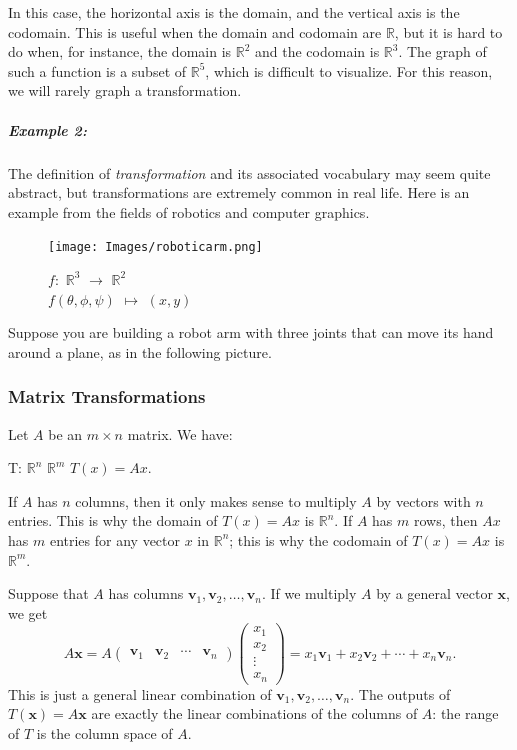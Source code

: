 \documentclass[a4paper,12pt]{article}
\begin{document}
In this case, the horizontal axis is the domain, and the vertical axis is the codomain. This is useful when the domain and codomain are $\mathbb{R}$, but it is hard to do when, for instance, the domain is $\mathbb{R}^2$ and the codomain is $\mathbb{R}^3$.
The graph of such a function is a subset of $\mathbb{R}^5$, which is difficult to visualize. For this reason, we will rarely graph a transformation.

\subparagraph{Example 2:}The definition of \textit{transformation} and its associated vocabulary may seem quite abstract, but transformations are extremely common in real life. Here is an example from the fields of robotics and computer graphics.
\begin{figure}[H]
    \centering
    \texttt{[image: Images/roboticarm.png]}
    \caption{$f:$ \(\mathbb{R}^3\) $\rightarrow$ \(\mathbb{R}^2\)\\
    \quad $f(\theta,\phi,\psi)$ $\longmapsto$ $(x,y)$
    }
    \label{fig:robotic-arm}
\end{figure}


Suppose you are building a robot arm with three joints that can move its hand around a plane, as in the following picture.

\subsubsection{Matrix Transformations}

\begin{tcolorbox}[title=Definition,colframe=blue!70!black, colback=blue!5!white]
Let $A$ be an $m \times n$ matrix. We have:
\begin{center}
T: \(\mathbb{R}^n\) \rightarrow \(\mathbb{R}^m\)  $T(x)=Ax$.
\end{center}
\end{tcolorbox}
If $A$ has $n$ columns, then it only makes sense to multiply $A$ by vectors with $n$ entries. This is why the domain of $T(x) = Ax$ is $\mathbb{R}^n$.  
If $A$ has $m$ rows, then $Ax$ has $m$ entries for any vector $x$ in $\mathbb{R}^n$; this is why the codomain of $T(x) = Ax$ is $\mathbb{R}^m$.

Suppose that \( A \) has columns \( \mathbf{v}_1, \mathbf{v}_2, \ldots, \mathbf{v}_n \). If we multiply \( A \) by a general vector \( \mathbf{x} \), we get
\[
A\mathbf{x} = A
\begin{pmatrix}
\mathbf{v}_1 & \mathbf{v}_2 & \cdots & \mathbf{v}_n
\end{pmatrix}
\begin{pmatrix}
x_1 \\
x_2 \\
\vdots \\
x_n
\end{pmatrix}
= x_1\mathbf{v}_1 + x_2\mathbf{v}_2 + \cdots + x_n\mathbf{v}_n.
\]
This is just a general linear combination of \( \mathbf{v}_1, \mathbf{v}_2, \ldots, \mathbf{v}_n \). The outputs of \( T(\mathbf{x}) = A\mathbf{x} \) are exactly the linear combinations of the columns of \( A \): the range of \( T \) is the column space of \( A \).
\end{document}
